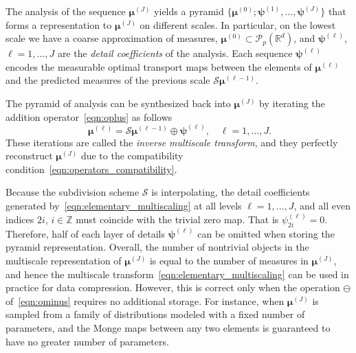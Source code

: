 \documentclass[12pt]{amsart}
\begin{document}
The analysis of the sequence $\boldsymbol{\mu}^{(J)}$ yields a pyramid $\{\boldsymbol{\mu}^{(0)}; \boldsymbol{\psi}^{(1)},\dots,\boldsymbol{\psi}^{(J)}\}$ that forms a representation to $\boldsymbol{\mu}^{(J)}$ on different scales. In particular, on the lowest scale we have a coarse approximation of measures, $\boldsymbol{\mu}^{(0)}\subset\mathcal{P}_p(\mathbb{R}^d)$, and $\boldsymbol{\psi}^{(\ell)}$, $\ell=1,\dots, J$ are the \emph{detail coefficients} of the analysis. Each sequence $\boldsymbol{\psi}^{(\ell)}$ encodes the measurable optimal transport maps between the elements of $\boldsymbol{\mu}^{(\ell)}$ and the predicted measures of the previous scale $\mathcal{S}\boldsymbol{\mu}^{(\ell-1)}$.

The pyramid of analysis can be synthesized back into $\boldsymbol{\mu}^{(J)}$ by iterating the addition operator~\eqref{eqn:oplus} as follows
\begin{equation}~\label{eqn:elementary_synthesis}
    \boldsymbol{\mu}^{(\ell)} = \mathcal{S}\boldsymbol{\mu}^{(\ell-1)}\oplus \boldsymbol{\psi}^{(\ell)}, \quad \ell=1,\dots, J.
\end{equation}
These iterations are called the \emph{inverse multiscale transform}, and they perfectly reconstruct $\boldsymbol{\mu}^{(J)}$ due to the compatibility condition~\eqref{eqn:operators_compatibility}.

Because the subdivision scheme $\mathcal{S}$ is interpolating, the detail coefficients generated by~\eqref{eqn:elementary_multiscaling} at all levels $\ell=1,\dots,J$, and all even indices $2i$, $i\in\mathbb{Z}$ must coincide with the trivial zero map. That is $\psi^{(\ell)}_{2i}=0$. Therefore, half of each layer of details $\boldsymbol{\psi}^{(\ell)}$ can be omitted when storing the pyramid representation. Overall, the number of nontrivial objects in the multiscale representation of $\boldsymbol{\mu}^{(J)}$ is equal to the number of measures in $\boldsymbol{\mu}^{(J)}$, and hence the multiscale transform~\eqref{eqn:elementary_multiscaling} can be used in practice for data compression. However, this is correct only when the operation $\ominus$ of~\eqref{eqn:ominus} requires no additional storage. For instance, when $\boldsymbol{\mu}^{(J)}$ is sampled from a family of distributions modeled with a fixed number of parameters, and the Monge maps between any two elements is guaranteed to have no greater number of parameters.
\end{document}
